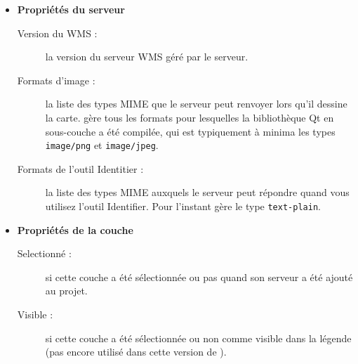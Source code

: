 \begin{itemize}[label=--]
\item \textbf{Propriétés du serveur}

\begin{description}
\item[Version du WMS :] la version du serveur WMS géré par le serveur.

\item[Formats d'image :]  la liste des types MIME que le serveur peut renvoyer lors qu'il dessine la carte. \qg gère tous les formats pour lesquelles la bibliothèque Qt en sous-couche a été compilée, qui est typiquement à minima les types \texttt{image/png} et \texttt{image/jpeg}.

\item[Formats de l'outil Identitier :]  la liste des types MIME auxquels le serveur peut répondre quand vous utilisez l'outil Identifier. Pour l'instant \qg gère le type \texttt{text-plain}.
\end{description}

\item \textbf{Propriétés de la couche}

\begin{description}
\item[Selectionné :]  si cette couche a été sélectionnée ou pas quand son serveur a été ajouté au projet.

\item[Visible :]  si cette couche a été sélectionnée ou non comme visible dans la légende (pas encore utilisé dans cette version de \qg).


\end{description}
\end{itemize}
